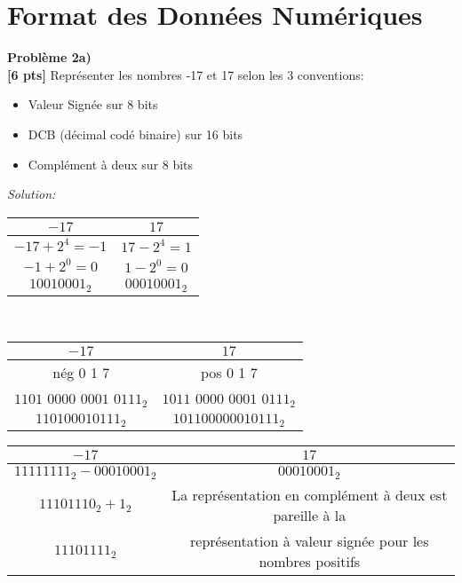 \documentclass{article}
\newenvironment{problem}[2][Problème]
    { \begin{mdframed}[backgroundcolor=gray!20] \textbf{#1 #2} \\}
    {  \end{mdframed}}
\newenvironment{solution}
    {\textit{Solution:}}
    {}
\begin{document}
\newpage

\section{Format des Données Numériques}

\begin{problem}{2a)}
\textbf{[6 pts]} Représenter les nombres -17 et 17 selon les 3 conventions:
    \begin{itemize}
        \item Valeur Signée sur 8 bits
        \item DCB (décimal codé binaire) sur 16 bits
        \item Complément à deux sur 8 bits
    \end{itemize}
\end{problem}

\begin{solution}
    \begin{tabular}{c|c}
        $-17$ & $17$\\
        \hline
        $-17+2^4 = -1$ & $17-2^4 = 1$\\
        $-1+2^0=0$ & $1-2^0=0$\\
        $10010001_2$ & $00010001_2$
    \end{tabular}
    \\
    \begin{tabular}[20pt]{c|c}
        $-17$ & $17$\\
        \hline
        nég \hspace{12pt}0 \hspace{12pt}1 \hspace{12pt} 7 \hspace{12pt}&pos \hspace{12pt}0 \hspace{12pt}1 \hspace{12pt} 7\\
        $1101$ $0000$ $0001$ $0111_2$ &$1011$ $0000$ $0001$ $0111_2$\\
        $110100010111_2$& $101100000010111_2$
    \end{tabular}
    \newline
    \begin{tabular}{c|c}
        $-17$ & $17$\\
        \hline
        $11111111_2 - 00010001_2$ & $00010001_2$\\
        $11101110_2 + 1_2$ & La représentation en complément à deux est pareille à la \\
        $11101111_2$ &  représentation à valeur signée pour les nombres positifs
    \end{tabular}
\end{solution}
\end{document}

